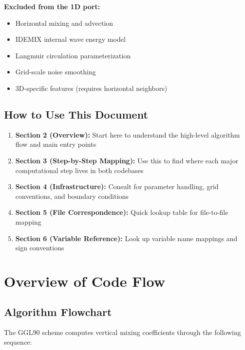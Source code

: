 \documentclass[11pt]{article}
\begin{document}
\textbf{Excluded from the 1D port:}
\begin{itemize}
    \item Horizontal mixing and advection
    \item IDEMIX internal wave energy model
    \item Langmuir circulation parameterization
    \item Grid-scale noise smoothing
    \item 3D-specific features (requires horizontal neighbors)
\end{itemize}

\subsection{How to Use This Document}

\begin{enumerate}
    \item \textbf{Section 2 (Overview):} Start here to understand the high-level algorithm flow and main entry points
    \item \textbf{Section 3 (Step-by-Step Mapping):} Use this to find where each major computational step lives in both codebases
    \item \textbf{Section 4 (Infrastructure):} Consult for parameter handling, grid conventions, and boundary conditions
    \item \textbf{Section 5 (File Correspondence):} Quick lookup table for file-to-file mapping
    \item \textbf{Section 6 (Variable Reference):} Look up variable name mappings and sign conventions
\end{enumerate}

\section{Overview of Code Flow}
\label{sec:overview}

\subsection{Algorithm Flowchart}

The GGL90 scheme computes vertical mixing coefficients through the following sequence:
\end{document}
